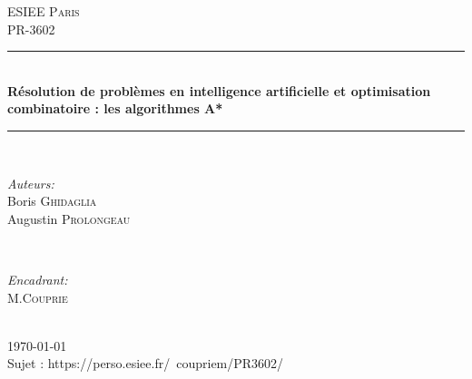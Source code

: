 \documentclass[11pt]{article} %
\begin{document}
\newcommand{\p}[1]{\par\noindent{#1}\\}
\newcommand{\pnr}[1]{\par\noindent{#1}}
\newcommand{\q}[1]{\par\noindent{\textbf{#1}}}
\newcommand{\m}[1]{\[#1\]}
\newcommand{\mt}[1]{$#1$}
\newcommand{\green}[1]{\textcolor{green}{#1}}


\begin{titlepage}

\newcommand{\HRule}{\rule{\linewidth}{0.5mm}} %

\center %

\textsc{\LARGE ESIEE Paris}\\[1.5cm] %
\textsc{\Large PR-3602}\\[0.5cm] %

\HRule \\[0.4cm]
{ \huge \bfseries Résolution de problèmes en intelligence artificielle et optimisation combinatoire : les algorithmes A*} %
\HRule \\[4cm]

\begin{minipage}{0.4\textwidth}
\begin{flushleft} \large
\emph{Auteurs:}\\
Boris \textsc{Ghidaglia}\\ %
Augustin \textsc{Prolongeau}\\ %
\end{flushleft}
\end{minipage}
~
\begin{minipage}{0.4\textwidth}
\begin{flushright} \large
\emph{Encadrant:} \\
M.\textsc{Couprie} %
\end{flushright}
\end{minipage}\\[4cm]

{\large \today}\\[3cm] %

{Sujet : https://perso.esiee.fr/~coupriem/PR3602/}


\vfill %

\end{titlepage}
\end{document}
